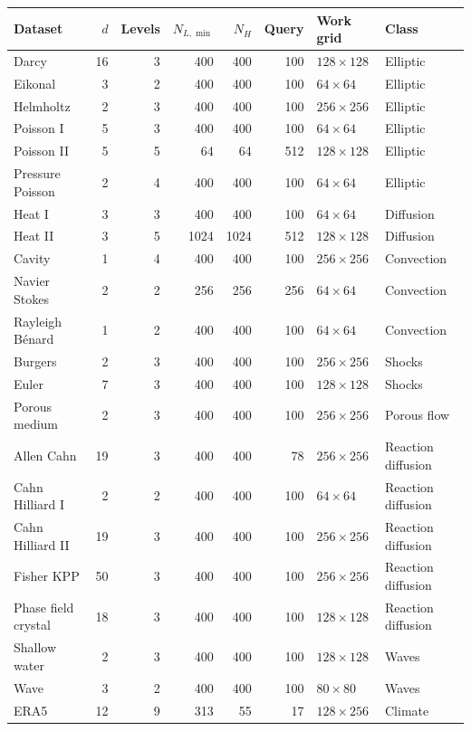 \begin{tabular}{lrrrrrll}
\toprule
Dataset & $d$ & Levels & $N_{L,\min}$ & $N_H$ & Query & Work grid & Class \\
\midrule
Darcy & 16 & 3 & 400 & 400 & 100 & $128\times128$ & Elliptic \\
Eikonal & 3 & 2 & 400 & 400 & 100 & $64\times64$ & Elliptic \\
Helmholtz & 2 & 3 & 400 & 400 & 100 & $256\times256$ & Elliptic \\
Poisson I & 5 & 3 & 400 & 400 & 100 & $64\times64$ & Elliptic \\
Poisson II \citep{niu2024} & 5 & 5 & 64 & 64 & 512 & $128\times128$ & Elliptic \\
Pressure Poisson & 2 & 4 & 400 & 400 & 100 & $64\times64$ & Elliptic \\
Heat I & 3 & 3 & 400 & 400 & 100 & $64\times64$ & Diffusion \\
Heat II \citep{niu2024} & 3 & 5 & 1024 & 1024 & 512 & $128\times128$ & Diffusion \\
Cavity & 1 & 4 & 400 & 400 & 100 & $256\times256$ & Convection \\
Navier Stokes \citep{niu2024} & 2 & 2 & 256 & 256 & 256 & $64\times64$ & Convection \\
Rayleigh Bénard & 1 & 2 & 400 & 400 & 100 & $64\times64$ & Convection \\
Burgers & 2 & 3 & 400 & 400 & 100 & $256\times256$ & Shocks \\
Euler & 7 & 3 & 400 & 400 & 100 & $128\times128$ & Shocks \\
Porous medium & 2 & 3 & 400 & 400 & 100 & $256\times256$ & Porous flow \\
Allen Cahn & 19 & 3 & 400 & 400 & 78 & $256\times256$ & Reaction diffusion \\
Cahn Hilliard I & 2 & 2 & 400 & 400 & 100 & $64\times64$ & Reaction diffusion \\
Cahn Hilliard II & 19 & 3 & 400 & 400 & 100 & $256\times256$ & Reaction diffusion \\
Fisher KPP & 50 & 3 & 400 & 400 & 100 & $256\times256$ & Reaction diffusion \\
Phase field crystal & 18 & 3 & 400 & 400 & 100 & $128\times128$ & Reaction diffusion \\
Shallow water & 2 & 3 & 400 & 400 & 100 & $128\times128$ & Waves \\
Wave & 3 & 2 & 400 & 400 & 100 & $80\times80$ & Waves \\
ERA5 \citep{hersbach2020,niu2024} & 12 & 9 & 313 & 55 & 17 & $128\times256$ & Climate \\
\bottomrule
\end{tabular}
